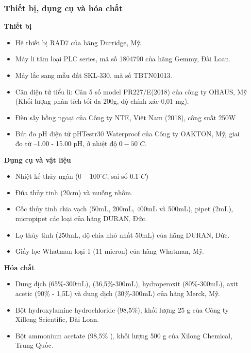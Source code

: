     \subsubsection{Thiết bị, dụng cụ và hóa chất}
    \textbf{Thiết bị}
        \begin{itemize}
            \item Hệ thiết bị RAD7 của hãng Durridge, Mỹ.
            \item Máy li tâm loại PLC series, mã số 1804790 của hãng Gemmy, Đài Loan.
            \item Máy lắc sang mẫu đất SKL-330, mã số TBTN01013.
            \item Cân điện tử tiểu li: Cân 5 số model PR227/E(2018) của công ty OHAUS, Mỹ (Khối lượng phân tích tối đa 200g, độ chính xác 0,01 mg).
            \item Đèn sấy hồng ngoại của Công ty NTE, Việt Nam (2018), công suất 250W
            \item Bút đo pH điện tử pHTestr30 Waterproof của Công ty OAKTON, Mỹ, giai đo từ –1.00 - 15.00 pH, ở nhiệt độ $0 - 50 ^\circ C$.
            
        \end{itemize}
    \textbf{Dụng cụ và vật liệu}
        \begin{itemize}
            \item Nhiệt kế thủy ngân ($0-100 ^\circ C$, sai số $0.1 ^\circ C$)
            \item Đũa thủy tinh (20cm) và muỗng nhôm.
            \item Cốc thủy tinh chia vạch (50mL, 200mL, 400mL và 500mL), pipet (2mL), micropipet các  loại của hãng DURAN, Đức.
            \item Lọ thủy tinh (250mL, độ chia nhỏ nhất 50mL) của hãng DURAN, Đức.
            \item Giấy lọc Whatman loại 1 (11 micron) của hãng Whatman, Mỹ.
        \end{itemize}
    \textbf{Hóa chất}
        \begin{itemize}
            \item Dung dịch  (65\%-300mL),  (36,5\%-300mL), hydroperoxit (80\%-300mL), axit acetic  (90\% - 1,5L)  và dung dịch  (30\%-300mL) của hãng Merck, Mỹ.
            \item Bột hydroxylamine hydrochloride  (98,5\%), khối lượng 25 g của Công ty Xilleng Scientific, Đài Loan.
            \item Bột ammonium acetate (98,5\% ), khối lượng 500 g của Xilong Chemical, Trung Quốc. 
        \end{itemize}

